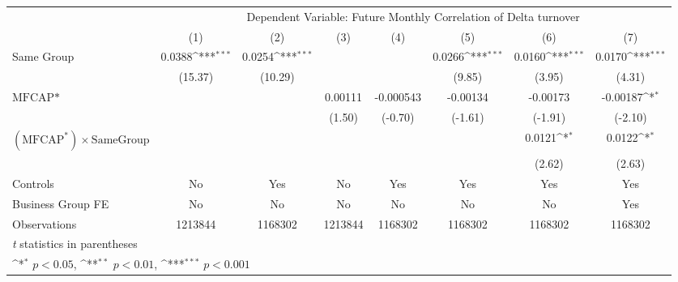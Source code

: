 {
\def\sym#1{\ifmmode^{#1}\else\(^{#1}\)\fi}
\begin{tabular}{l*{7}{c}}
\hline\hline
                &\multicolumn{7}{c}{Dependent Variable:  Future Monthly Correlation of Delta turnover}                                               \\\cmidrule(lr){2-8}
                &\multicolumn{1}{c}{(1)}         &\multicolumn{1}{c}{(2)}         &\multicolumn{1}{c}{(3)}         &\multicolumn{1}{c}{(4)}         &\multicolumn{1}{c}{(5)}         &\multicolumn{1}{c}{(6)}         &\multicolumn{1}{c}{(7)}         \\
\hline
Same Group      &   0.0388\sym{***}&   0.0254\sym{***}&                  &                  &   0.0266\sym{***}&   0.0160\sym{***}&   0.0170\sym{***}\\
                &  (15.37)         &  (10.29)         &                  &                  &   (9.85)         &   (3.95)         &   (4.31)         \\
[1em]
$ \text{MFCAP*} $&                  &                  &  0.00111         &-0.000543         & -0.00134         & -0.00173         & -0.00187\sym{*}  \\
                &                  &                  &   (1.50)         &  (-0.70)         &  (-1.61)         &  (-1.91)         &  (-2.10)         \\
[1em]
 $ (\text{MFCAP}^*) \times {\text{SameGroup} }  $ &                  &                  &                  &                  &                  &   0.0121\sym{*}  &   0.0122\sym{*}  \\
                &                  &                  &                  &                  &                  &   (2.62)         &   (2.63)         \\
\hline
Controls        &       No         &      Yes         &       No         &      Yes         &      Yes         &      Yes         &      Yes         \\
Business Group FE&       No         &       No         &       No         &       No         &       No         &       No         &      Yes         \\
Observations    &  1213844         &  1168302         &  1213844         &  1168302         &  1168302         &  1168302         &  1168302         \\
\hline\hline
\multicolumn{8}{l}{\footnotesize \textit{t} statistics in parentheses}\\
\multicolumn{8}{l}{\footnotesize \sym{*} \(p<0.05\), \sym{**} \(p<0.01\), \sym{***} \(p<0.001\)}\\
\end{tabular}
}
